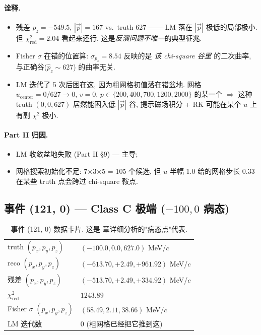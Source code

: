 \paragraph{诠释.}
\begin{itemize}[nosep]
  \item 残差 $p_z = -549.5$, $|\vec p| = 167$ vs.\ truth 627 —— LM 落在 $|\vec p|$ 极低的局部极小. 但 $\chi^2_{\mathrm{red}} = 2.04$ 看起来还行, 这是\emph{反演问题不唯一}的典型征兆.
  \item Fisher $\sigma$ 在错的位置算: $\sigma_{p_z} = 8.54$ 反映的是 \emph{该 chi-square 谷里} 的二次曲率, 与正确谷($\hat p_z \sim 627$) 的曲率无关.
  \item LM 迭代了 5 次后困在这, 因为粗网格初值落在错盆地. 网格 $u_{\mathrm{center}} = 0 / 627 \to 0$, $v = 0$, $p \in \{200, 400, 700, 1200, 2000\}$ 的某一个 $\Rightarrow$ 这种 truth $(0, 0, 627)$ 居然能困入低 $|\vec p|$ 谷, 提示磁场积分 + RK 可能在某个 $u$ 上有副 $\chi^2$ 极小.
\end{itemize}

\paragraph{Part II 归因.}
\begin{itemize}[nosep]
  \item LM 收敛盆地失败 (Part II §9) — 主导;
  \item 网格搜索初始化不足: 7$\times$3$\times$5 = 105 个候选, 但 $u$ 半幅 1.0 给的网格步长 $0.33$ 在某些 truth 点会跨过 chi-square 鞍点.
\end{itemize}

\subsection{事件 (121, 0) — Class C 极端 ($-100, 0$ 病态)}
\label{sec:partIII:case_studies:event_121}

\begin{table}[H]
\centering\small
\caption{事件 (121, 0) 数据卡片. 这是  章详细分析的"病态点"代表.}
\begin{tabular}{ll}
\toprule
truth $(p_x, p_y, p_z)$ & $(-100.0, 0.0, 627.0)$ MeV/$c$ \\
reco $(p_x, p_y, p_z)$ & $(-613.70, +2.49, +961.92)$ MeV/$c$ \\
残差 $(p_x, p_y, p_z)$ & $(-513.70, +2.49, +334.92)$ MeV/$c$ \\
$\chi^2_{\mathrm{red}}$ & $1243.89$ \\
Fisher $\sigma$ $(p_x, p_y, p_z)$ & $(58.49, 2.11, 38.66)$ MeV/$c$ \\
LM 迭代数 & 0 (粗网格已经把它推到这) \\
\bottomrule
\end{tabular}
\end{table}


